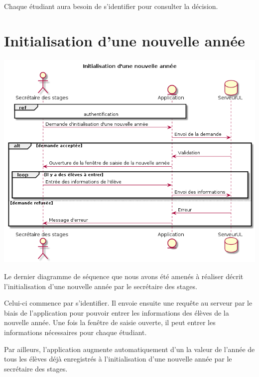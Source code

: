 \documentclass[11pt, a4paper]{report}
\begin{document}
\hspace{0.6cm}Chaque étudiant aura besoin de s’identifier pour consulter la décision. 
 
\section*{Initialisation d'une nouvelle année}
\centerline{\includegraphics[scale=0.6]{Images/initialisationnouvelleannee.png}}
\hspace{1cm}Le dernier diagramme de séquence que nous avons été amenés à réaliser décrit l’initialisation d’une nouvelle année par le secrétaire des stages.\vspace{0.2cm}

\hspace{0.6cm}Celui-ci commence par s’identifier. Il envoie ensuite une requête au serveur par le biais de l’application pour pouvoir entrer les informations des élèves de la nouvelle année. Une fois la fenêtre de saisie ouverte, il peut entrer les informations nécessaires pour chaque étudiant.\vspace{0.2cm}

\hspace{0.6cm}Par ailleurs, l’application augmente automatiquement d’un la valeur de l’année de tous les élèves déjà enregistrés à l’initialisation d’une nouvelle année par le secrétaire des stages.

\newpage
\end{document}
